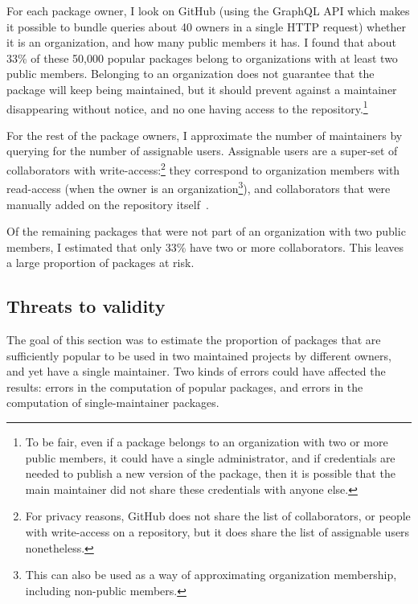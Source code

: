 For each package owner, I look on GitHub (using the GraphQL API which makes it possible to bundle queries about 40 owners in a single HTTP request) whether it is an organization, and how many public members it has.
I found that about 33\% of these 50,000 popular packages belong to organizations with at least two public members.
Belonging to an organization does not guarantee that the package will keep being maintained, but it should prevent against a maintainer disappearing without notice, and no one having access to the repository.\footnote{
	To be fair, even if a package belongs to an organization with two or more public members, it could have a single administrator, and if credentials are needed to publish a new version of the package, then it is possible that the main maintainer did not share these credentials with anyone else.
}

For the rest of the package owners, I approximate the number of maintainers by querying for the number of assignable users.
Assignable users are a super-set of collaborators with write-access:\footnote{
	For privacy reasons, GitHub does not share the list of collaborators, or people with write-access on a repository, but it does share the list of assignable users nonetheless.
}
they correspond to organization members with read-access (when the owner is an organization\footnote{
	This can also be used as a way of approximating organization membership, including non-public members.
}), and collaborators that were manually added on the repository itself~\cite{github_assign}.

Of the remaining packages that were not part of an organization with two public members, I estimated that only 33\% have two or more collaborators.
This leaves a large proportion of packages at risk.

\subsection{Threats to validity}

The goal of this section was to estimate the proportion of packages that are sufficiently popular to be used in two maintained projects by different owners, and yet have a single maintainer.
Two kinds of errors could have affected the results: errors in the computation of popular packages, and errors in the computation of single-maintainer packages.


